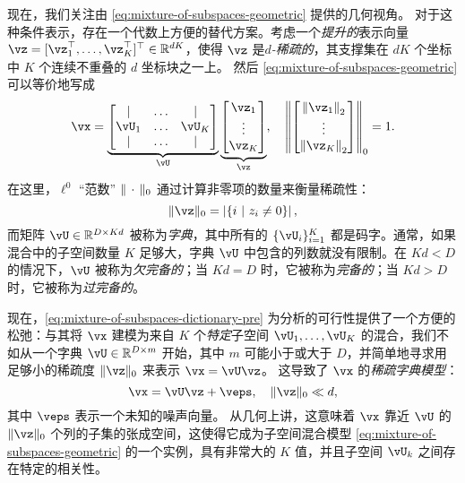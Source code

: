 \documentclass[../../book-main.tex]{subfiles}
\begin{document}
现在，我们关注由 \eqref{eq:mixture-of-subspaces-geometric} 提供的几何视角。
对于这种条件表示，存在一个代数上方便的替代方案。考虑一个\textit{提升的}表示向量 $\vz = [\vz_1^\top, \dots, \vz_K^\top]^\top \in \R^{dK}$，使得 $\vz$ 是\textit{$d$-稀疏的}，其支撑集在 $dK$ 个坐标中 $K$ 个连续不重叠的 $d$ 坐标块之一上。
然后 \eqref{eq:mixture-of-subspaces-geometric} 可以等价地写成
\begin{equation}\label{eq:mixture-of-subspaces-dictionary-pre}
    \vx = 
    \underbrace{
    \begin{bmatrix} 
    | & \hdots & |  \\
    \vU_1 & \hdots & \vU_K  \\
    | & \hdots & | 
    \end{bmatrix} 
    }_{\vU}
    \underbrace{
    \begin{bmatrix} \vz_1 \\ \vdots \\ \vz_K \end{bmatrix}
    }_{\vz},
    \quad
    \norm*{
    \begin{bmatrix} \norm*{\vz_1}_2 \\ \vdots \\ \norm*{\vz_K}_2 \end{bmatrix}
    }_0 = 1.
\end{equation}
在这里，$\ell^0$ “范数” $\norm{\,\cdot\,}_0$ 通过计算非零项的数量来衡量稀疏性：
\begin{equation}\label{eq:ell-zero-norm}
    \norm{\vz}_0 = \abs*{\set{i \given z_i \neq 0}},
\end{equation}
而矩阵 $\vU \in \R^{D \times Kd}$ 被称为\textit{字典}，其中所有的 $\{\vU_i\}_{i=1}^K$ 都是码字。通常，如果混合中的子空间数量 $K$ 足够大，字典 $\vU$ 中包含的列数就没有限制。在 $Kd < D$ 的情况下，$\vU$ 被称为\textit{欠完备的}；当 $Kd = D$ 时，它被称为\textit{完备的}；当 $Kd > D$ 时，它被称为\textit{过完备的}。

现在，\eqref{eq:mixture-of-subspaces-dictionary-pre} 为分析的可行性提供了一个方便的松弛：与其将 $\vx$ 建模为来自 $K$ 个\textit{特定}子空间 $\vU_1, \dots, \vU_K$ 的混合，我们不如从一个字典 $\vU \in \R^{D \times m}$ 开始，其中 $m$ 可能小于或大于 $D$，并简单地寻求用足够小的稀疏度 $\norm{\vz}_0$ 来表示 $\vx = \vU \vz$。
这导致了 $\vx$ 的\textit{稀疏字典模型}：
\begin{equation}\label{eq:mixture-of-subspaces-dictionary}
    \vx =  \vU \vz + \veps,
    \quad
    \norm{\vz}_0 \ll d,
\end{equation}
其中 $\veps$ 表示一个未知的噪声向量。
从几何上讲，这意味着 $\vx$ 靠近 $\vU$ 的 $\norm{\vz}_0$ 个列的子集的张成空间，这使得它成为子空间混合模型 \eqref{eq:mixture-of-subspaces-geometric} 的一个实例，具有非常大的 $K$ 值，并且子空间 $\vU_k$ 之间存在特定的相关性。
\end{document}

